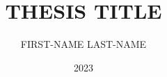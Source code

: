 \documentclass{class/NTUASE_MR}
\title{THESIS TITLE}
\subtitle{FIRST-NAME LAST-NAME}
\affiliation{Asian School of the Environment \\
College of Science}
\date{2023}
\begin{document}
    \makefrontmatter
	\listoffigures
	\listoftables

    \cleardoublepage


    \ifdefined\isdraft
        \doublespacing
    \else
        \onehalfspacing
    \fi

    
    
    
    


    \begin{appendices}

        
        

    \end{appendices}
\end{document}
